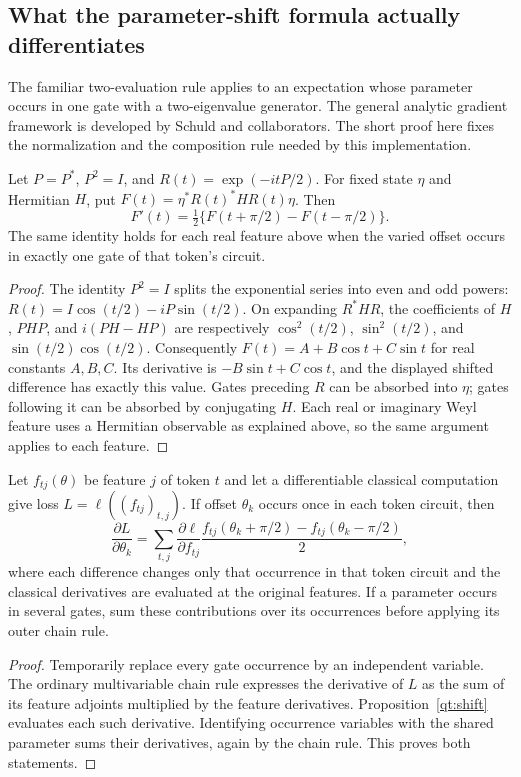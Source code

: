 \subsection{What the parameter-shift formula actually differentiates}

The familiar two-evaluation rule applies to an expectation whose parameter
occurs in one gate with a two-eigenvalue generator. The general analytic
gradient framework is developed by Schuld and collaborators.
\cite{QSSchuld2019} The short proof here fixes the normalization and
the composition rule needed by this implementation.

\begin{proposition}
\label{qt:shift}
Let $P=P^*$, $P^2=I$, and
$R(t)=\exp(-itP/2)$. For fixed state $\eta$ and Hermitian $H$, put
$F(t)=\eta^*R(t)^*H R(t)\eta$. Then
\[
 F'(t)=\tfrac12\{F(t+\pi/2)-F(t-\pi/2)\}.
\]
The same identity holds for each real feature above when the varied
offset occurs in exactly one gate of that token's circuit.
\end{proposition}
\begin{proof}
The identity $P^2=I$ splits the exponential series into even and odd powers:
$R(t)=I\cos(t/2)-iP\sin(t/2)$. On expanding $R^*HR$, the coefficients of
$H$, $PHP$, and $i(PH-HP)$ are respectively
$\cos^2(t/2)$, $\sin^2(t/2)$, and $\sin(t/2)\cos(t/2)$.
Consequently $F(t)=A+B\cos t+C\sin t$ for real constants $A,B,C$.
Its derivative is $-B\sin t+C\cos t$, and the displayed shifted difference
has exactly this value. Gates preceding $R$ can be absorbed into $\eta$;
gates following it can be absorbed by conjugating $H$. Each real or
imaginary Weyl feature uses a Hermitian observable as explained above, so
the same argument applies to each feature.
\end{proof}

\begin{proposition}
\label{qt:chain-rule}
Let $f_{tj}(\theta)$ be feature $j$ of token $t$ and let a differentiable
classical computation give loss $L=\ell((f_{tj})_{t,j})$. If offset
$\theta_k$ occurs once in each token circuit, then
\[
 \frac{\partial L}{\partial\theta_k}
 =\sum_{t,j}\frac{\partial\ell}{\partial f_{tj}}
 \frac{f_{tj}(\theta_k+\pi/2)-f_{tj}(\theta_k-\pi/2)}2,
\]
where each difference changes only that occurrence in that token circuit
and the classical derivatives are evaluated at the original features.
If a parameter occurs in several gates, sum these contributions over its
occurrences before applying its outer chain rule.
\end{proposition}
\begin{proof}
Temporarily replace every gate occurrence by an independent variable.
The ordinary multivariable chain rule expresses the derivative of $L$ as
the sum of its feature adjoints multiplied by the feature derivatives.
Proposition~\ref{qt:shift} evaluates each such derivative. Identifying
occurrence variables with the shared parameter sums their derivatives,
again by the chain rule. This proves both statements.
\end{proof}

